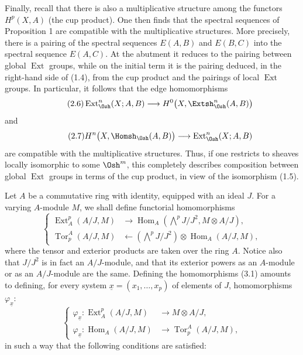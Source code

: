 Finally, recall that there is also a multiplicative structure among the functors
$H^{p}(X,A)$ (the cup product). One then finds that the spectral sequences of
Proposition 1 are compatible with the multiplicative structures. More
precisely, there is a pairing of the spectral sequences $E(A,B)$ and $E(B,C)$
into the spectral sequence $E(A,C)$. At the abutment it reduces to the pairing
between global $\operatorname{Ext}$ groups, while on the initial term it is the
pairing deduced, in the right-hand side of (1.4), from the cup product and the
pairings of local $\operatorname{Ext}$ groups. In particular, it follows that
the edge homomorphisms
\begin{equation}\tag{2.6}
  \operatorname{Ext}_{\Osh}^{n}(X;A,B)
  \longrightarrow H^{0}\bigl(X,\Extsh_{\Osh}^{n}(A,B)\bigr)
\end{equation}
and
\begin{equation}\tag{2.7}
  H^{n}\bigl(X,\Homsh_{\Osh}(A,B)\bigr)
  \longrightarrow\operatorname{Ext}_{\Osh}^{n}(X;A,B)
\end{equation}
are compatible with the multiplicative structures. Thus, if one restricts to
sheaves locally isomorphic to some $\Osh^{m}$, this completely describes
composition between global $\operatorname{Ext}$ groups in terms of the cup
product, in view of the isomorphism (1.5).


Let $A$ be a commutative ring with identity, equipped with an ideal $J$. For a
varying $A$-module $M$, we shall define functorial homomorphisms
\begin{equation}\tag{3.1}
\left\{
\begin{aligned}
\operatorname{Ext}_{A}^{p}(A/J,M)
  &\longrightarrow
  \operatorname{Hom}_{A}\!\left(\bigwedge^{p}J/J^{2},M\otimes A/J\right),\\
\operatorname{Tor}_{p}^{A}(A/J,M)
  &\longleftarrow
  \left(\bigwedge^{p}J/J^{2}\right)
  \otimes\operatorname{Hom}_{A}(A/J,M),
\end{aligned}
\right.
\end{equation}
where the tensor and exterior products are taken over the ring $A$. Notice also
that $J/J^{2}$ is in fact an $A/J$-module, and that its exterior powers as an
$A$-module or as an $A/J$-module are the same. Defining the homomorphisms (3.1)
amounts to defining, for every system
$\underline{x}=(x_1,\ldots,x_p)$ of elements of $J$, homomorphisms
$\varphi_{\underline{x}}$:
\begin{equation}\tag{3.2}
\left\{
\begin{aligned}
\varphi_{\underline{x}}:
  \operatorname{Ext}_{A}^{p}(A/J,M)&\longrightarrow M\otimes A/J,\\
\varphi_{\underline{x}}:
  \operatorname{Hom}_{A}(A/J,M)&\longrightarrow
  \operatorname{Tor}_{p}^{A}(A/J,M),
\end{aligned}
\right.
\end{equation}
in such a way that the following conditions are satisfied:


